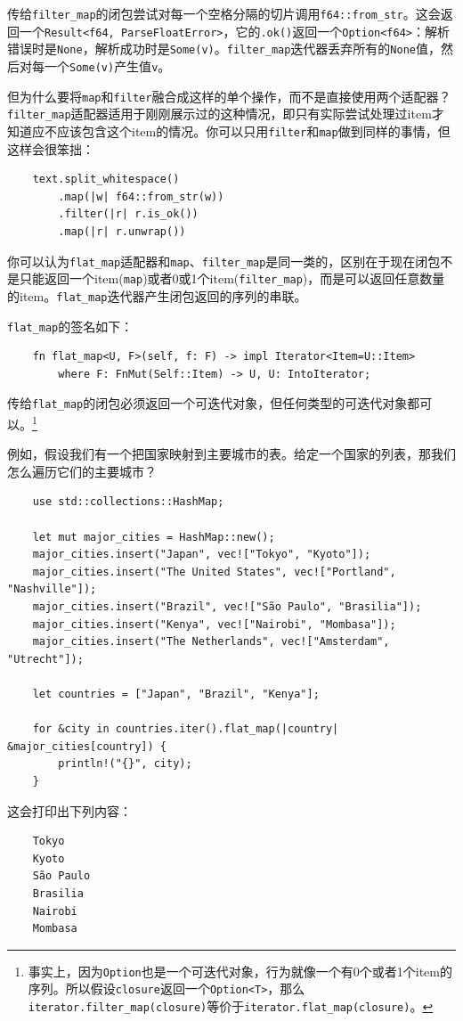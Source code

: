 传给\texttt{filter\_map}的闭包尝试对每一个空格分隔的切片调用\texttt{f64::from\_str}。这会返回一个\texttt{Result<f64, ParseFloatError>}，它的\texttt{.ok()}返回一个\texttt{Option<f64>}：解析错误时是\texttt{None}，解析成功时是\texttt{Some(v)}。\texttt{filter\_map}迭代器丢弃所有的\texttt{None}值，然后对每一个\texttt{Some(v)}产生值\texttt{v}。

但为什么要将\texttt{map}和\texttt{filter}融合成这样的单个操作，而不是直接使用两个适配器？\texttt{filter\_map}适配器适用于刚刚展示过的这种情况，即只有实际尝试处理过item才知道应不应该包含这个item的情况。你可以只用\texttt{filter}和\texttt{map}做到同样的事情，但这样会很笨拙：
\begin{verbatim}
    text.split_whitespace()
        .map(|w| f64::from_str(w))
        .filter(|r| r.is_ok())
        .map(|r| r.unwrap())
\end{verbatim}

你可以认为\texttt{flat\_map}适配器和\texttt{map}、\texttt{filter\_map}是同一类的，区别在于现在闭包不是只能返回一个item(\texttt{map})或者0或1个item(\texttt{filter\_map})，而是可以返回任意数量的item。\texttt{flat\_map}迭代器产生闭包返回的序列的串联。

\texttt{flat\_map}的签名如下：
\begin{verbatim}
    fn flat_map<U, F>(self, f: F) -> impl Iterator<Item=U::Item>
        where F: FnMut(Self::Item) -> U, U: IntoIterator;
\end{verbatim}
传给\texttt{flat\_map}的闭包必须返回一个可迭代对象，但任何类型的可迭代对象都可以。\footnote{事实上，因为\texttt{Option}也是一个可迭代对象，行为就像一个有0个或者1个item的序列。所以假设\texttt{closure}返回一个\texttt{Option<T>}，那么\texttt{iterator.filter\_map(closure)}等价于\texttt{iterator.flat\_map(closure)}。}

例如，假设我们有一个把国家映射到主要城市的表。给定一个国家的列表，那我们怎么遍历它们的主要城市？
\begin{verbatim}
    use std::collections::HashMap;

    let mut major_cities = HashMap::new();
    major_cities.insert("Japan", vec!["Tokyo", "Kyoto"]);
    major_cities.insert("The United States", vec!["Portland", "Nashville"]);
    major_cities.insert("Brazil", vec!["São Paulo", "Brasilia"]);
    major_cities.insert("Kenya", vec!["Nairobi", "Mombasa"]);
    major_cities.insert("The Netherlands", vec!["Amsterdam", "Utrecht"]);

    let countries = ["Japan", "Brazil", "Kenya"];

    for &city in countries.iter().flat_map(|country| &major_cities[country]) {
        println!("{}", city);
    }
\end{verbatim}
这会打印出下列内容：
\begin{verbatim}
    Tokyo
    Kyoto
    São Paulo
    Brasilia
    Nairobi
    Mombasa
\end{verbatim}

